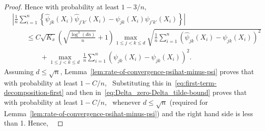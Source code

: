 \documentclass{article}
\begin{document}
\begin{appendices}
\begin{proof}
 
 
 
 
 
 
 
 
 
 
 
 
 Hence with probability at least $1 - 3/n,$
 \begin{equation}\label{eq:first-term-decomposition-first}
 \begin{split}
 &\left|\frac{1}{n}\sum_{i=1}^n \left\{\widehat{\psi}_{jk}(X_i)\widehat{\psi}_{j'k'}(X_i) - \psi_{jk}(X_i)\psi_{j'k'}(X_i)\right\}\right|\\ &\qquad\le C\sqrt{K_x}\left(\sqrt{\frac{\log^3(dn)}{n}} + 1\right)\max_{1\le j < k\le d}\sqrt{\frac{1}{n}\sum_{i=1}^n \left(\widehat{\psi}_{jk}(X_i) - \psi_{jk}(X_i)\right)^2}\\
 &\qquad\qquad+ \max_{1\le j < k\le d}\,{\frac{1}{n}\sum_{i=1}^n \left(\widehat{\psi}_{jk}(X_i) - \psi_{jk}(X_i)\right)^2}.
 \end{split}
 \end{equation}
 Assuming $d \le \sqrt{n}$, Lemma~\ref{lem:rate-of-convergence-psihat-minus-psi} proves that with probability at least $1 - C/n$,
 \
 Substituting this in~\eqref{eq:first-term-decomposition-first} and then in~\eqref{eq:Delta_zero-Delta_tilde-bound} proves that with probability at least $1 - C/n$,
 \
 whenever  $d \le \sqrt{n}$ (required for Lemma~\ref{lem:rate-of-convergence-psihat-minus-psi}) and the right hand side is less than 1. Hence,
 \
 \end{proof}
 

\end{appendices}
\end{document}
